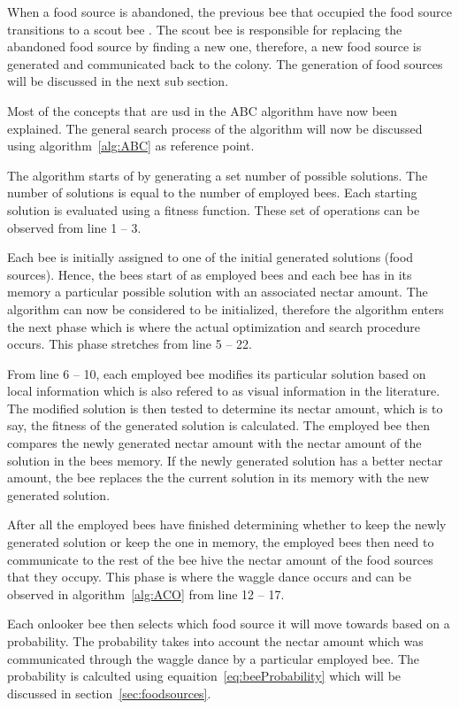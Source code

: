 When a food source is abandoned, the previous bee that occupied the food source transitions to a scout bee \cite{ABCCompareStudy,ABCNumericalOptimization}. The scout bee is responsible for replacing the abandoned food source by finding a new one, therefore, a new food source is generated and communicated back to the colony\cite{ABCCompareStudy,ABCImageEnhancement,ABCNumericalOptimization}. The generation of food sources will be discussed in the next sub section.

Most of the concepts that are usd in the ABC algorithm have now been explained. The general search process of the algorithm will now be discussed using algorithm~\ref{alg:ABC} as reference point.

The algorithm starts of by generating a set number of possible solutions. The number of solutions is equal to the number of employed bees. Each starting solution is evaluated using a fitness function. These set of operations can be observed from line 1 -- 3.

Each bee is initially assigned to one of the initial generated solutions (food sources). Hence, the bees start of as employed bees and each bee has in its memory a particular possible solution with an associated nectar amount. The algorithm can now be considered to be initialized, therefore the algorithm enters the next phase which is where the actual optimization and search procedure occurs. This phase stretches from line 5 -- 22.

From line 6 -- 10, each employed bee modifies its particular solution based on local information which is also refered to as visual information in the literature. The modified solution is then tested to determine its nectar amount, which is to say, the fitness of the generated solution is calculated. The employed bee then compares the newly generated nectar amount with the nectar amount of the solution in the bees memory. If the newly generated solution has a better nectar amount, the bee replaces the the current solution in its memory with the new generated solution.

After all the employed bees have finished determining whether to keep the newly generated solution or keep the one in memory, the employed bees then need to communicate to the rest of the bee hive the nectar amount of the food sources that they occupy. This phase is where the waggle dance occurs and can be observed in algorithm~\ref{alg:ACO} from line 12 -- 17.

Each onlooker bee then selects which food source it will move towards based on a probability. The probability takes into account the nectar amount which was communicated through the waggle dance by a particular employed bee. The probability is calculted using equaition~\ref{eq:beeProbability} which will be discussed in section~\ref{sec:foodsources}.


